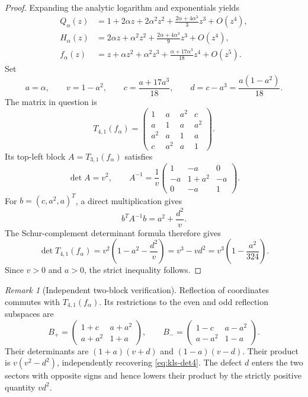 \documentclass[11pt,a4paper]{article}
\numberwithin{equation}{section}
\theoremstyle{definition}\newtheorem{definition}[theorem]{Definition}
\theoremstyle{remark}\newtheorem{remark}[theorem]{Remark}
\begin{document}
\begin{proof}
Expanding the analytic logarithm and exponentials yields
\begin{align*}
 Q_\alpha(z)
  &=1+2\alpha z+2\alpha^2z^2
     +\frac{2\alpha+4\alpha^3}{3}z^3+O(z^4),\\
 H_\alpha(z)
  &=2\alpha z+\alpha^2z^2
     +\frac{2\alpha+4\alpha^3}{9}z^3+O(z^4),\\
 f_\alpha(z)
  &=z+\alpha z^2+\alpha^2z^3
     +\frac{\alpha+17\alpha^3}{18}z^4+O(z^5).
\end{align*}
Set
\[
 a=\alpha,\qquad v=1-a^2,\qquad
 c=\frac{a+17a^3}{18},\qquad
 d=c-a^3=\frac{a(1-a^2)}{18}.
\]
The matrix in question is
\[
 T_{4,1}(f_\alpha)=
 \begin{pmatrix}
 1&a&a^2&c\\
 a&1&a&a^2\\
 a^2&a&1&a\\
 c&a^2&a&1
 \end{pmatrix}.
\]
Its top-left block $A=T_{3,1}(f_\alpha)$ satisfies
\[
 \det A=v^2,
 \qquad
 A^{-1}=\frac1v
 \begin{pmatrix}
 1&-a&0\\
 -a&1+a^2&-a\\
 0&-a&1
 \end{pmatrix}.
\]
For $b=(c,a^2,a)^T$, a direct multiplication gives
\[
 b^TA^{-1}b=a^2+\frac{d^2}{v}.
\]
The Schur-complement determinant formula therefore gives
\[
 \det T_{4,1}(f_\alpha)
  =v^2\left(1-a^2-\frac{d^2}{v}\right)
  =v^3-vd^2
  =v^3\left(1-\frac{a^2}{324}\right).
\]
Since $v>0$ and $a>0$, the strict inequality follows.
\end{proof}

\begin{remark}[Independent two-block verification]
Reflection of coordinates commutes with $T_{4,1}(f_\alpha)$.
Its restrictions to the even and odd reflection subspaces are
\[
 B_+=\begin{pmatrix}1+c&a+a^2\\a+a^2&1+a\end{pmatrix},
 \qquad
 B_-=\begin{pmatrix}1-c&a-a^2\\a-a^2&1-a\end{pmatrix}.
\]
Their determinants are $(1+a)(v+d)$ and $(1-a)(v-d)$.
Their product is $v(v^2-d^2)$, independently recovering
\eqref{eq:kls-det4}.  The defect $d$ enters the two sectors with
opposite signs and hence lowers their product by the strictly positive
quantity $vd^2$.
\end{remark}
\end{document}
